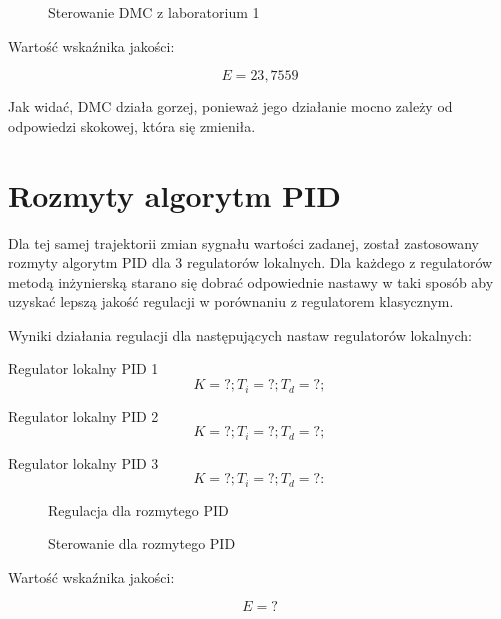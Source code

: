 \begin{figure}[H]
\centering

\caption{Sterowanie DMC z laboratorium 1}
\end{figure}

Wartość wskaźnika jakości:

\begin{equation}
E = 23,7559
\end{equation}

Jak widać, DMC działa gorzej, ponieważ jego działanie mocno zależy od odpowiedzi skokowej, która się zmieniła.

\section{Rozmyty algorytm PID}

Dla tej samej trajektorii zmian sygnału wartości zadanej, został zastosowany rozmyty algorytm PID dla 3 regulatorów lokalnych. Dla każdego z regulatorów metodą inżynierską starano się 
dobrać odpowiednie nastawy w taki sposób aby uzyskać lepszą jakość regulacji w porównaniu z regulatorem klasycznym.

Wyniki działania regulacji dla następujących nastaw regulatorów lokalnych:

Regulator lokalny PID 1
\begin{equation}
K = ?; 
T_i = ?; 
T_d = ?; 
\end{equation}

Regulator lokalny PID 2
\begin{equation}
K = ?; 
T_i = ?; 
T_d = ?; 
\end{equation}

Regulator lokalny PID 3
\begin{equation}
K = ?; 
T_i = ?; 
T_d = ?: 
\end{equation}

\begin{figure}[H]
\centering

\caption{Regulacja dla rozmytego PID}
\end{figure}

\begin{figure}[H]
\centering

\caption{Sterowanie dla rozmytego PID}
\end{figure}

Wartość wskaźnika jakości:

\begin{equation}
E = ?
\end{equation}


